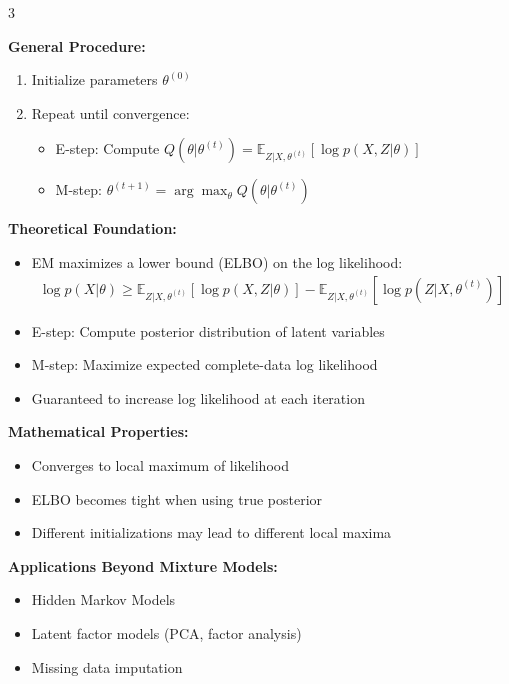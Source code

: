 \documentclass[10pt,landscape]{article}
\begin{document}
\begin{multicols}{3}
\begin{tcolorbox}[breakable, title=6.1 Expectation-Maximization (EM) Algorithm, colback=mixture]
\textbf{General Procedure:}
\begin{enumerate}[leftmargin=*,noitemsep,topsep=0pt]
    \item Initialize parameters $\theta^{(0)}$
    \item Repeat until convergence:
    \begin{itemize}[leftmargin=*,noitemsep]
        \item E-step: Compute 
        $Q(\theta|\theta^{(t)}) = \mathbb{E}_{Z|X,\theta^{(t)}}[\log p(X, Z|\theta)]$
        \item M-step: $\theta^{(t+1)} = \arg\max_\theta Q(\theta|\theta^{(t)})$
    \end{itemize}
\end{enumerate}

\textbf{Theoretical Foundation:}
\begin{itemize}[leftmargin=*,noitemsep,topsep=0pt]
    \item EM maximizes a lower bound (ELBO) on the log likelihood:
    \begin{align}
    \log p(X|\theta) \geq \mathbb{E}_{Z|X,\theta^{(t)}}[\log p(X,Z|\theta)] - \mathbb{E}_{Z|X,\theta^{(t)}}[\log p(Z|X,\theta^{(t)})]
    \end{align}
    \item E-step: Compute posterior distribution of latent variables
    \item M-step: Maximize expected complete-data log likelihood
    \item Guaranteed to increase log likelihood at each iteration
\end{itemize}

\textbf{Mathematical Properties:}
\begin{itemize}[leftmargin=*,noitemsep,topsep=0pt]
    \item Converges to local maximum of likelihood
    \item ELBO becomes tight when using true posterior
    \item Different initializations may lead to different local maxima
\end{itemize}

\textbf{Applications Beyond Mixture Models:}
\begin{itemize}[leftmargin=*,noitemsep,topsep=0pt]
    \item Hidden Markov Models
    \item Latent factor models (PCA, factor analysis)
    \item Missing data imputation
\end{itemize}
\end{tcolorbox}


\end{multicols}
\end{document}
